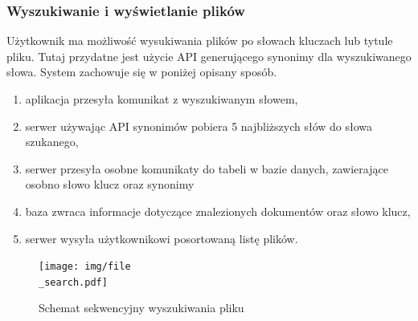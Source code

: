 \documentclass[12pt,a4paper,twoside]{article}
\begin{document}
\subsubsection*{Wyszukiwanie i wyświetlanie plików}
Użytkownik ma możliwość wysukiwania plików po słowach kluczach lub tytule pliku. Tutaj przydatne jest użycie API generującego synonimy dla wyszukiwanego słowa. System zachowuje się w poniżej opisany sposób.
\begin{enumerate}
	\item aplikacja przesyła komunikat z wyszukiwanym słowem,
	\item serwer używając API synonimów pobiera 5 najbliższych słów do słowa szukanego,
	\item serwer przesyła osobne komunikaty do tabeli w bazie danych, zawierające osobno słowo klucz oraz synonimy
	\item baza zwraca informacje dotyczące znalezionych dokumentów oraz słowo klucz,
	\item serwer wysyła użytkownikowi posortowaną listę plików.
\end{enumerate}
\begin{figure}[h!]
\centering
  \texttt{[image: img/file\\\_search.pdf]}
  \caption{Schemat sekwencyjny wyszukiwania pliku}
\end{figure}
\end{document}
